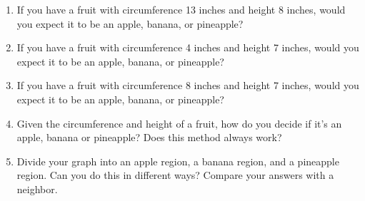 \documentclass[10pt]{article}
\begin{document}
\begin{enumerate}
\item If you have a fruit with circumference 13 inches and height 8 inches, would you expect it to be an apple, banana, or pineapple?
\vspace{1cm}

\item If you have a fruit with circumference 4 inches and height 7 inches, would you expect it to be an apple, banana, or pineapple?
\vspace{1cm}

\item If you have a fruit with circumference 8 inches and height 7 inches, would you expect it to be an apple, banana, or pineapple?
\vspace{1cm}

\item Given the circumference and height of a fruit, how do you decide if it's an apple, banana or pineapple? Does this method always work?
\vfill

\item Divide your graph into an apple region, a banana region, and a pineapple region. Can you do this in different ways? Compare your answers with a neighbor.

\end{enumerate}
\end{document}
